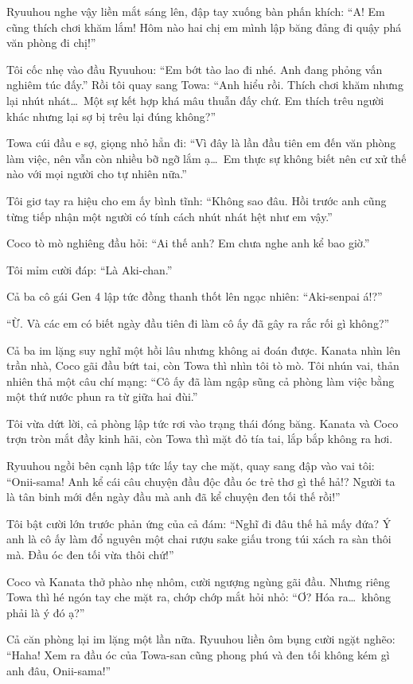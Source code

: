 \documentclass[../main.tex]{subfiles}
\begin{document}
Ryuuhou nghe vậy liền mắt sáng lên, đập tay xuống bàn phấn khích: ``A! Em cũng thích chơi khăm lắm! Hôm nào hai chị em mình lập băng đảng đi quậy phá văn phòng đi chị!''

Tôi cốc nhẹ vào đầu Ryuuhou: ``Em bớt tào lao đi nhé. Anh đang phỏng vấn nghiêm túc đấy.'' Rồi tôi quay sang Towa: ``Anh hiểu rồi. Thích chơi khăm nhưng lại nhút nhát\dots\ Một sự kết hợp khá mâu thuẫn đấy chứ. Em thích trêu người khác nhưng lại sợ bị trêu lại đúng không?''

Towa cúi đầu e sợ, giọng nhỏ hẳn đi: ``Vì đây là lần đầu tiên em đến văn phòng làm việc, nên vẫn còn nhiều bỡ ngỡ lắm ạ\dots\ Em thực sự không biết nên cư xử thế nào với mọi người cho tự nhiên nữa.''

Tôi giơ tay ra hiệu cho em ấy bình tĩnh: ``Không sao đâu. Hồi trước anh cũng từng tiếp nhận một người có tính cách nhút nhát hệt như em vậy.''

Coco tò mò nghiêng đầu hỏi: ``Ai thế anh? Em chưa nghe anh kể bao giờ.''

Tôi mỉm cười đáp: ``Là Aki-chan.''

Cả ba cô gái Gen 4 lập tức đồng thanh thốt lên ngạc nhiên: ``Aki-senpai á!?''

``Ừ. Và các em có biết ngày đầu tiên đi làm cô ấy đã gây ra rắc rối gì không?''

Cả ba im lặng suy nghĩ một hồi lâu nhưng không ai đoán được. Kanata nhìn lên trần nhà, Coco gãi đầu bứt tai, còn Towa thì nhìn tôi tò mò. Tôi nhún vai, thản nhiên thả một câu chí mạng: ``Cô ấy đã làm ngập sũng cả phòng làm việc bằng một thứ nước phun ra từ giữa hai đùi.''

Tôi vừa dứt lời, cả phòng lập tức rơi vào trạng thái đóng băng. Kanata và Coco trợn tròn mắt đầy kinh hãi, còn Towa thì mặt đỏ tía tai, lắp bắp không ra hơi.

Ryuuhou ngồi bên cạnh lập tức lấy tay che mặt, quay sang đập vào vai tôi: ``Onii-sama! Anh kể cái câu chuyện đầu độc đầu óc trẻ thơ gì thế hả!? Người ta là tân binh mới đến ngày đầu mà anh đã kể chuyện đen tối thế rồi!''

Tôi bật cười lớn trước phản ứng của cả đám: ``Nghĩ đi đâu thế hả mấy đứa? Ý anh là cô ấy làm đổ nguyên một chai rượu sake giấu trong túi xách ra sàn thôi mà. Đầu óc đen tối vừa thôi chứ!''

Coco và Kanata thở phào nhẹ nhôm, cười ngượng ngùng gãi đầu. Nhưng riêng Towa thì hé ngón tay che mặt ra, chớp chớp mắt hỏi nhỏ: ``Ơ? Hóa ra\dots\ không phải là ý đó ạ?''

Cả căn phòng lại im lặng một lần nữa. Ryuuhou liền ôm bụng cười ngặt nghẽo: ``Haha! Xem ra đầu óc của Towa-san cũng phong phú và đen tối không kém gì anh đâu, Onii-sama!''
\end{document}
